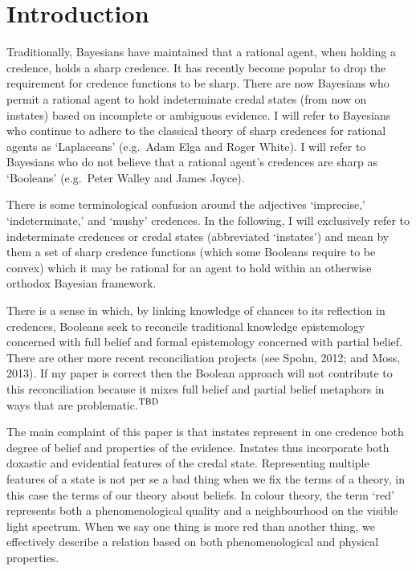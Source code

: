 \documentclass[journal]{IEEEtran}
\newcommand{\qnull}[1]{`#1'}
\newcommand{\doxnotep}[0]{doxastic}
\newcommand{\fcut}[1]{}
\newcommand{\bcut}[1]{}
\newcommand{\tbd}[1]{$^{\mbox{\textsc{tbd}}}$}
\begin{document}
\section{Introduction}
\label{Introduction}

Traditionally, Bayesians have maintained that a rational agent, when
holding a credence, holds a sharp credence. It has recently become
popular to drop the requirement for credence functions to be sharp.
There are now Bayesians who permit a rational agent to hold
indeterminate credal states (from now on instates) based on incomplete
or ambiguous evidence. I will refer to Bayesians who continue to
adhere to the classical theory of sharp credences for rational agents
as \qnull{Laplaceans} (e.g.\ Adam Elga and Roger White). I will refer
to Bayesians who do not believe that a rational agent's credences are
sharp as \qnull{Booleans} (e.g.\ Peter Walley and James
Joyce).\fcut{1}

There is some terminological confusion around the adjectives
\qnull{imprecise,} \qnull{indeterminate,} and \qnull{mushy} credences.
In the following, I will exclusively refer to indeterminate credences
or credal states (abbreviated \qnull{instates}) and mean by them a set
of sharp credence functions (which some Booleans require to be convex)
which it may be rational for an agent to hold within an otherwise
orthodox Bayesian framework.\bcut{1}

There is a sense in which, by linking knowledge of chances to its
reflection in credences, Booleans seek to reconcile traditional
knowledge epistemology concerned with full belief and formal
epistemology concerned with partial belief. There are other more
recent reconciliation projects (see Spohn, 2012; and Moss, 2013). If
my paper is correct then the Boolean approach will not contribute to
this reconciliation because it mixes full belief and partial belief
metaphors in ways that are problematic.\tbd{rephrase}\fcut{2}\bcut{2}

The main complaint of this paper is that instates represent in one
credence both degree of belief and properties of the evidence.
Instates thus incorporate both {\doxnotep} and evidential features of
the credal state. Representing multiple features of a state is not per
se a bad thing when we fix the terms of a theory, in this case the
terms of our theory about beliefs. In colour theory, the term
\qnull{red} represents both a phenomenological quality and a
neighbourhood on the visible light spectrum. When we say one thing is
more red than another thing, we effectively describe a relation based
on both phenomenological and physical properties.
\end{document}

